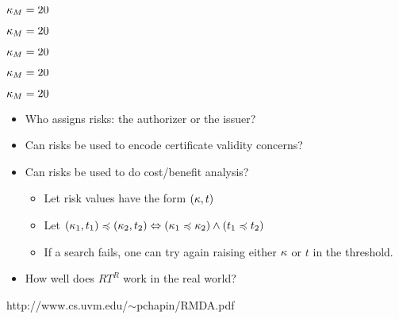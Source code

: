 \documentclass[landscape]{slides}
\begin{document}
\stopslide




\centerline{\box\graph}

$\kappa_M = 20$
\stopslide




\centerline{\box\graph}

$\kappa_M = 20$
\stopslide




\centerline{\box\graph}

$\kappa_M = 20$
\stopslide


\centerline{\box\graph}

$\kappa_M = 20$
\stopslide



\centerline{\box\graph}

$\kappa_M = 20$
\stopslide



\begin{itemize}
\item Who assigns risks: the authorizer or the issuer?
\item Can risks be used to encode certificate validity concerns?
\item Can risks be used to do cost/benefit analysis?
\begin{itemize}
\item Let risk values have the form $(\kappa, t)$
\item Let $(\kappa_1, t_1) \preccurlyeq (\kappa_2, t_2) \Leftrightarrow (\kappa_1 \preccurlyeq \kappa_2) \wedge (t_1 \preccurlyeq t_2)$
\item If a search fails, one can try again raising either $\kappa$ or $t$ in the threshold.
\end{itemize}
\item How well does $RT^R$ work in the real world?
\end{itemize}

\stopslide


\centerline{http://www.cs.uvm.edu/$\sim$pchapin/RMDA.pdf}
\stopslide
\end{document}
